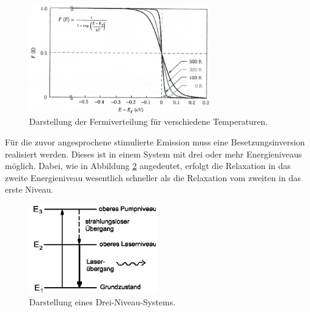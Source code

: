 \begin{figure}[H]
\centering
\includegraphics[width=0.7\textwidth]{ressources/fermi.png}
\caption{Darstellung der Fermiverteilung für verschiedene Temperaturen. \cite{SZE}}
\label{sze1}
\end{figure}


Für die zuvor angesprochene stimulierte Emission muss eine Besetzungsinversion realisiert werden. Dieses ist in einem System mit drei oder mehr Energieniveaus möglich. Dabei, wie in Abbildung \ref{theo1} angedeutet, erfolgt die Relaxation in das zweite Energieniveau wesentlich schneller als die Relaxation vom zweiten in das erste Niveau. 


\begin{figure}[H]
\centering
\includegraphics[width=0.5\textwidth]{ressources/Niveau.jpeg}
\caption{Darstellung eines Drei-Niveau-Systems. \cite{skript}}
\label{theo1}
\end{figure}



